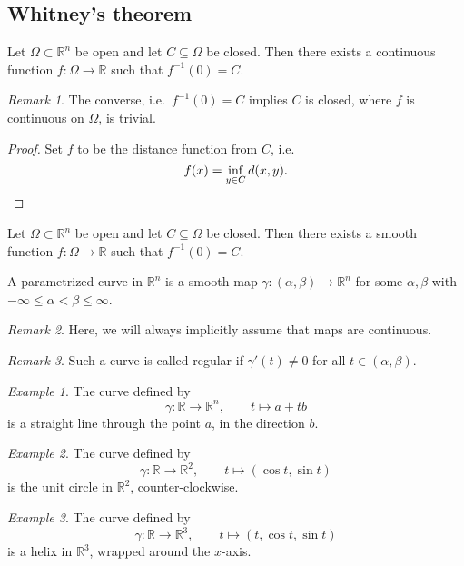 \documentclass[11pt]{article}
\newcommand{\R}{\mathbb{R}}
\theoremstyle{definition}
\theoremstyle{remark}
\newtheorem*{remark}{Remark}
\newtheorem*{example}{Example}
\numberwithin{equation}{section}
\begin{document}
    \subsection{Whitney's theorem}
    
    \begin{lemma}
        Let $\Omega \subset \R^n$ be open and let $C \subseteq \Omega$ be closed.
        Then there exists a continuous function $f\colon \Omega \to \R$ such that
        $f^{-1}(0) = C$.
        \begin{remark}
            The converse, i.e.\ $f^{-1}(0) = C$ implies $C$ is closed, where $f$ is
            continuous on $\Omega$, is trivial.
        \end{remark}
    \end{lemma}
    \begin{proof}
        Set $f$ to be the distance function from $C$, i.e.\ \[
            f(x) = \inf_{y \in C} d(x, y). \qedhere
        \] 
    \end{proof}

    \begin{theorem}
        Let $\Omega \subset \R^n$ be open and let $C \subseteq \Omega$ be closed.
        Then there exists a smooth function $f\colon \Omega \to \R$ such that
        $f^{-1}(0) = C$.
    \end{theorem}

    \begin{definition}
        A parametrized curve in $\R^n$ is a smooth map $\gamma\colon (\alpha, \beta)
        \to \R^n$ for some $\alpha, \beta$ with $-\infty \leq \alpha < \beta \leq
        \infty$.
        \begin{remark}
            Here, we will always implicitly assume that maps are continuous.
        \end{remark}
        \begin{remark}
            Such a curve is called regular if $\gamma'(t) \neq 0$ for all $t \in
            (\alpha, \beta)$.
        \end{remark}
    \end{definition}
    \begin{example}
        The curve defined by \[
            \gamma\colon \R \to \R^n, \qquad t \mapsto a + tb
        \] is a straight line through the point $a$, in the direction $b$.
    \end{example}
    \begin{example}
        The curve defined by \[
            \gamma\colon \R \to \R^2, \qquad t \mapsto (\cos{t}, \sin{t})
        \] is the unit circle in $\R^2$, counter-clockwise.
    \end{example}
    \begin{example}
        The curve defined by \[
            \gamma\colon \R \to \R^3, \qquad t \mapsto (t, \cos{t}, \sin{t})
        \] is a helix in $\R^3$, wrapped around the $x$-axis.
    \end{example}
\end{document}
